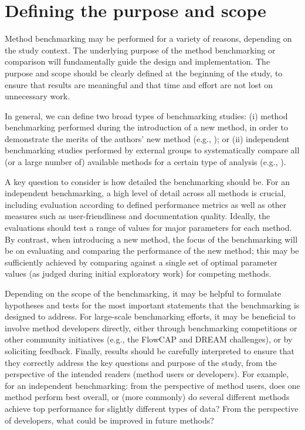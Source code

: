 \documentclass[12pt, a4paper]{article}
\begin{document}
\vskip 1.5cm




\section*{Defining the purpose and scope}

Method benchmarking may be performed for a variety of reasons, depending on the study context. The underlying purpose of the method benchmarking or comparison will fundamentally guide the design and implementation. The purpose and scope should be clearly defined at the beginning of the study, to ensure that results are meaningful and that time and effort are not lost on unnecessary work.

In general, we can define two broad types of benchmarking studies: (i) method benchmarking performed during the introduction of a new method, in order to demonstrate the merits of the authors' new method (e.g., \citep{Weber2018, Nowicka2016, Levine2015, Zhou2014, Law2014}); or (ii) independent benchmarking studies performed by external groups to systematically compare all (or a large number of) available methods for a certain type of analysis (e.g., \citep{Saelens2018a, Saelens2018b, Duo2018, Soneson2018, Weber2016}).

A key question to consider is how detailed the benchmarking should be. For an independent benchmarking, a high level of detail across all methods is crucial, including evaluation according to defined performance metrics as well as other measures such as user-friendliness and documentation quality. Ideally, the evaluations should test a range of values for major parameters for each method. By contrast, when introducing a new method, the focus of the benchmarking will be on evaluating and comparing the performance of the new method; this may be sufficiently achieved by comparing against a single set of optimal parameter values (as judged during initial exploratory work) for competing methods.

Depending on the scope of the benchmarking, it may be helpful to formulate hypotheses and tests for the most important statements that the benchmarking is designed to address. For large-scale benchmarking efforts, it may be beneficial to involve method developers directly, either through benchmarking competitions or other community initiatives (e.g., the FlowCAP \citep{Aghaeepour2013, Aghaeepour2016} and DREAM \citep{Eduati2015} challenges), or by soliciting feedback. Finally, results should be carefully interpreted to ensure that they correctly address the key questions and purpose of the study, from the perspective of the intended readers (method users or developers). For example, for an independent benchmarking: from the perspective of method users, does one method perform best overall, or (more commonly) do several different methods achieve top performance for slightly different types of data? From the perspective of developers, what could be improved in future methods?
\end{document}
